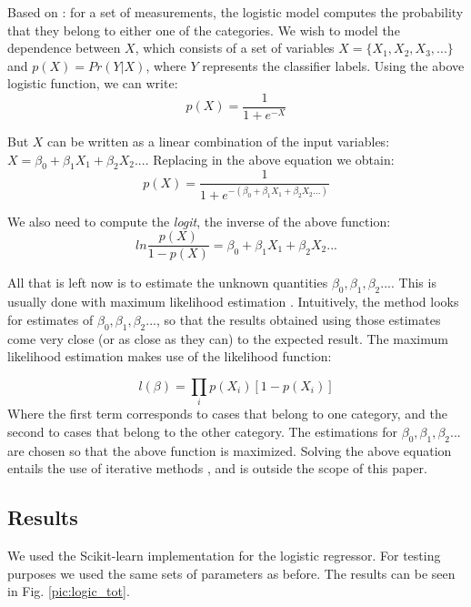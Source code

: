Based on \cite{kleinbaum2010logistic,logmodel,statistics}: for a set of measurements, the logistic model computes the probability that they belong to either one of the categories. We wish to model the dependence between $X$, which consists of a set of variables $X = \lbrace X_1,X_2,X_3,... \rbrace$ and $p(X) = Pr(Y \vert X)$, where $Y$ represents the classifier labels. Using the above logistic function, we can write:
\begin{equation*}
p(X) = \frac{1}{1+e^{-X}}
\end{equation*}

But $X$ can be written as a linear combination of the input variables: $X = \beta_0 + \beta_1X_1 + \beta_2X_2 ...$. Replacing in the above equation we obtain:
\begin{equation*}
p(X) = \frac{1}{1+e^{-(\beta_0 + \beta_1X_1 + \beta_2X_2 ...)}}
\end{equation*}

We also need to compute the \textit{logit}, the inverse of the above function:
\begin{equation*}
ln\frac{p(X)}{1 - p(X)} = \beta_0 + \beta_1X_1 + \beta_2X_2 ...
\end{equation*}

All that is left now is to estimate the unknown quantities $\beta_0, \beta_1, \beta_2...$. This is usually done with maximum likelihood estimation \cite{menard2009logistic}. Intuitively, the method looks for estimates of $\beta_0, \beta_1, \beta_2...$, so that the results obtained using those estimates come very close (or as close as they can) to the expected result. The maximum likelihood estimation makes use of the likelihood function:

\begin{equation*}
l(\beta) = \prod_ip(X_i)[1 - p(X_i)]
\end{equation*} 
Where the first term corresponds to cases that belong to one category, and the second to cases that belong to the other category. The estimations for $\beta_0, \beta_1, \beta_2...$ are chosen so that the above function is maximized. Solving the above equation entails the use of iterative methods \cite{logmodel}, and is outside the scope of this paper.
 
\subsection{Results}

We used the Scikit-learn \cite{scikit-learn} implementation for the logistic regressor. For testing purposes we used the same sets of parameters as before. The results can be seen in Fig. \ref{pic:logic_tot}.

